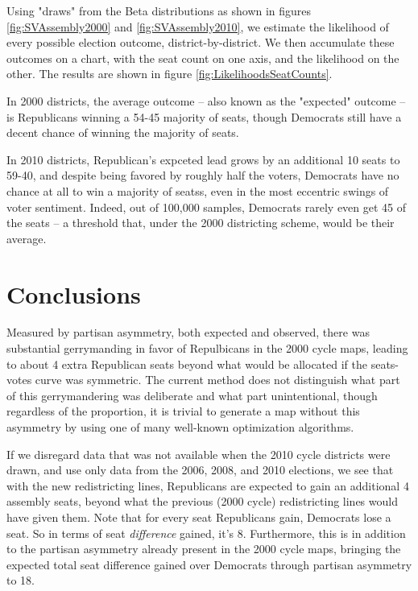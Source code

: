 \documentclass[preprint,12pt]{article}
\begin{document}
Using "draws" from the Beta distributions as shown in figures \ref{fig:SVAssembly2000} and \ref{fig:SVAssembly2010}, we estimate the likelihood of every possible election outcome, district-by-district.
We then accumulate these outcomes on a chart, with the seat count on one axis, and the likelihood on the other.  The results are shown in figure \ref{fig:LikelihoodsSeatCounts}.

In 2000 districts, the average outcome -- also known as the "expected" outcome -- is Republicans winning a 54-45 majority of seats, though Democrats still have a decent chance of winning the majority of seats. 

In 2010 districts, Republican's expceted lead grows by an additional 10 seats to 59-40, and despite being favored by roughly half the voters, Democrats have no chance at all to win a majority of seatss,  even in the most eccentric swings of voter sentiment.
Indeed, out of 100,000 samples, Democrats rarely even get 45 of the seats -- a threshold that, under the 2000 districting scheme, would be their average.

\section{Conclusions}

Measured by partisan asymmetry, both expected and observed, there was substantial gerrymanding in favor of Repulbicans in the 2000 cycle maps, leading to about 4 extra Republican seats beyond what would be allocated if the seats-votes curve was symmetric.
The current method does not distinguish what part of this gerrymandering was deliberate and what part unintentional, though regardless of the proportion, it is trivial to generate a map without this asymmetry by using one of many well-known optimization algorithms.

If we disregard data that was not available when the 2010 cycle districts were drawn, and use only data from the 2006, 2008, and 2010 elections, we see that with the new redistricting lines, Republicans are expected to gain an additional 4 assembly seats, beyond what the previous (2000 cycle) redistricting lines would have given them.
Note that for every seat Republicans gain, Democrats lose a seat.  So in terms of seat \emph{difference} gained, it's 8.
Furthermore, this is in addition to the partisan asymmetry already present in the 2000 cycle maps, bringing the expected total seat difference gained over Democrats through partisan asymmetry to 18.
\end{document}

